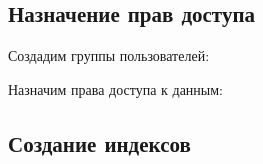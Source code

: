 \documentclass[a4paper,14pt]{article}
\begin{document}

\subsection{Назначение прав доступа}

Создадим группы пользователей:

{\small }

Назначим права доступа к данным:

{\small }

\subsection{Создание индексов}

{\small }
%	
\end{document}
